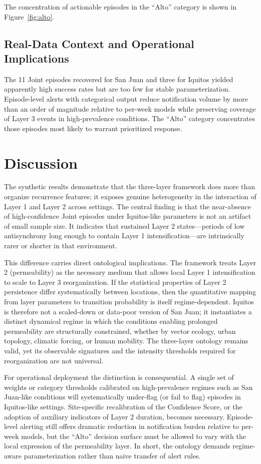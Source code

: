 \documentclass[11pt,a4paper]{article}
\begin{document}
The concentration of actionable episodes in the ``Alto'' category is shown in Figure~\ref{fig:alto}.

\subsection{Real-Data Context and Operational Implications}

The 11 Joint episodes recovered for San Juan and three for Iquitos yielded apparently high success rates but are too few for stable parameterization. Episode-level alerts with categorical output reduce notification volume by more than an order of magnitude relative to per-week models while preserving coverage of Layer 3 events in high-prevalence conditions. The “Alto” category concentrates those episodes most likely to warrant prioritized response.

\section{Discussion}

The synthetic results demonstrate that the three-layer framework does more than organize recurrence features; it exposes genuine heterogeneity in the interaction of Layer 1 and Layer 2 across settings. The central finding is that the near-absence of high-confidence Joint episodes under Iquitos-like parameters is not an artifact of small sample size. It indicates that sustained Layer 2 states---periods of low antisynchrony long enough to contain Layer 1 intensification---are intrinsically rarer or shorter in that environment.

This difference carries direct ontological implications. The framework treats Layer 2 (permeability) as the necessary medium that allows local Layer 1 intensification to scale to Layer 3 reorganization. If the statistical properties of Layer 2 persistence differ systematically between locations, then the quantitative mapping from layer parameters to transition probability is itself regime-dependent. Iquitos is therefore not a scaled-down or data-poor version of San Juan; it instantiates a distinct dynamical regime in which the conditions enabling prolonged permeability are structurally constrained, whether by vector ecology, urban topology, climatic forcing, or human mobility. The three-layer ontology remains valid, yet its observable signatures and the intensity thresholds required for reorganization are not universal.

For operational deployment the distinction is consequential. A single set of weights or category thresholds calibrated on high-prevalence regimes such as San Juan-like conditions will systematically under-flag (or fail to flag) episodes in Iquitos-like settings. Site-specific recalibration of the Confidence Score, or the adoption of auxiliary indicators of Layer 2 duration, becomes necessary. Episode-level alerting still offers dramatic reduction in notification burden relative to per-week models, but the ``Alto'' decision surface must be allowed to vary with the local expression of the permeability layer. In short, the ontology demands regime-aware parameterization rather than naive transfer of alert rules.
\end{document}

